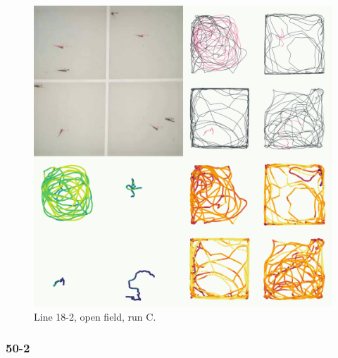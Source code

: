 \documentclass[
]{book}
\begin{document}
\begin{figure}
\includegraphics[width=1\linewidth]{figs/mikk_behaviour/four_panel_plots/open_field_20191119_1459_18-2_R_C_300} \caption{Line 18-2, open field, run C.}\label{fig:4p-18-2-of-C}
\end{figure}

\hypertarget{section-3}{%
\subsubsection{50-2}\label{section-3}}
\end{document}

